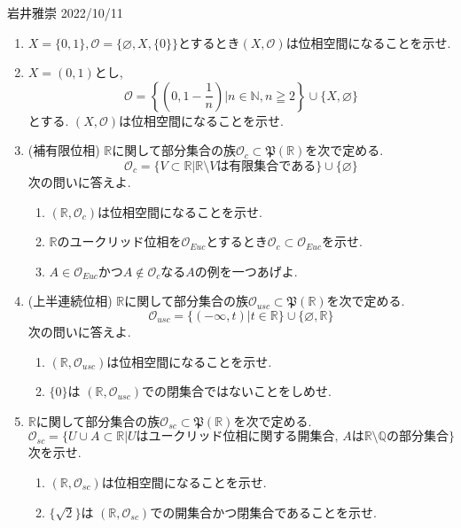 \documentclass[dvipdfmx,a4paper,11pt]{article}
\newcommand{\R}{\mathbb{R}}
\newcommand{\Q}{\mathbb{Q}}
\newcommand{\N}{\mathbb{N}}
\theoremstyle{definition}
\begin{document}
\begin{flushright}
 岩井雅崇 2022/10/11
\end{flushright}
\begin{enumerate}[ label=\textbf{問}2.\arabic*]
\item $X = \{ 0,1\}, \mathscr{O} = \{ \varnothing, X, \{0\} \}$とするとき$(X, \mathscr{O})$は位相空間になることを示せ.

\item $X = (0,1)$とし, 
$$
\mathscr{O} = \left\{ \left(0,1 - \frac{1}{n}\right)| n \in \N, n \geqq 2 \right\} \cup \{ X,\varnothing \}
$$
とする. $(X, \mathscr{O})$は位相空間になることを示せ.

\item (補有限位相)
$\R$に関して部分集合の族$\mathscr{O}_c \subset \mathfrak{P}(\R)$を次で定める.
$$
\mathscr{O}_c = \{V \subset \R | \text{$\R \setminus V$は有限集合である} \} \cup \{  \varnothing  \}
$$
次の問いに答えよ.
	\begin{enumerate}
	\item $(\R,\mathscr{O}_c)$は位相空間になることを示せ.
	\item $\R$のユークリッド位相を$\mathscr{O}_{Euc}$とするとき$\mathscr{O}_c  \subset \mathscr{O}_{Euc}$を示せ. 
	\item $A \in \mathscr{O}_{Euc}$かつ$A \not \in \mathscr{O}_c$なる$A$の例を一つあげよ.
	\end{enumerate}
	
\item (上半連続位相) $\R$に関して部分集合の族$\mathscr{O}_{usc} \subset \mathfrak{P}(\R)$を次で定める.
$$
\mathscr{O}_{usc} = \{(- \infty,t) | t \in \R \} \cup \{  \varnothing , \R \}
$$
次の問いに答えよ.
	\begin{enumerate}
	\item $(\R,\mathscr{O}_{usc})$は位相空間になることを示せ.
	\item $\{ 0\}$は $(\R,\mathscr{O}_{usc})$での閉集合ではないことをしめせ. 
	\end{enumerate}
	
\item $\R$に関して部分集合の族$\mathscr{O}_{sc} \subset \mathfrak{P}(\R)$を次で定める.
$$
\mathscr{O}_{sc}  = \{U \cup A \subset \R | \text{$U$はユークリッド位相に関する開集合, $A$は$\R \setminus \Q$の部分集合}\}
$$
次を示せ.
	\begin{enumerate}
	\item $(\R,\mathscr{O}_{sc} )$は位相空間になることを示せ.
	\item $\{ \sqrt{2}\}$は $(\R,\mathscr{O}_{sc} )$での開集合かつ閉集合であることを示せ.
	\end{enumerate}
	

\end{enumerate}
\end{document}
